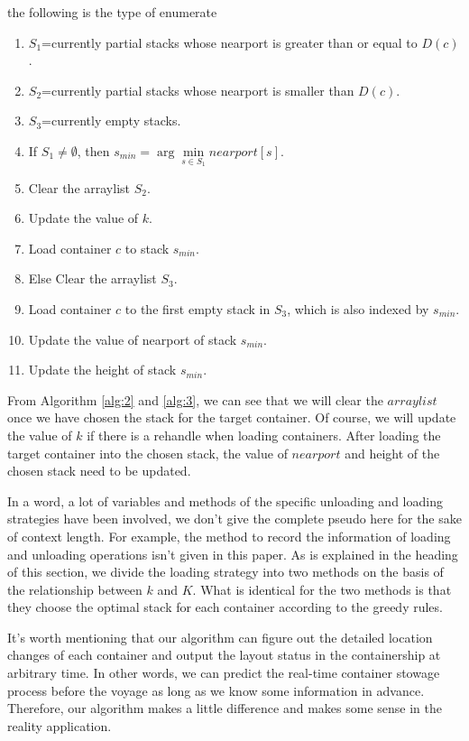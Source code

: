 \documentclass[review,3p,times,authoryear,12pt]{elsarticle}
\begin{document}
the following is the type of enumerate

\begin{enumerate}[step 1]
\item $S_1$=currently partial stacks whose nearport is greater than or equal to $D(c)$.
\item $S_2$=currently partial stacks whose nearport is smaller than $D(c)$.
\item $S_3$=currently empty stacks.
\item If $S_1\neq \emptyset$, then $s_{min}=\arg\min \limits_{s\in S_1} nearport[s]$.
\item Clear the arraylist $S_2$.
\item Update the value of $k$.
\item Load container $c$ to stack $s_{min}$.
\item Else Clear the arraylist $S_3$.
\item Load container $c$ to the first empty stack in $S_3$, which is also indexed by $s_{min}$.
\item Update the value of nearport of stack $s_{min}$.
\item Update the height of stack $s_{min}$.
\end{enumerate}

From Algorithm \ref{alg:2} and \ref{alg:3}, we can see that we will clear the $arraylist$ once we have chosen the stack for the target container.
Of course, we will update the value of $k$ if there is a rehandle when loading containers.
After loading the target container into the chosen stack, the value of $nearport$ and height of the chosen stack need to be updated.

In a word, a lot of variables and methods of the specific unloading and loading strategies have been involved, we don't give the complete pseudo here for the sake of context length.
For example, the method to record the information of loading and unloading operations isn't given in this paper.
As is explained in the heading of this section, we divide the loading strategy into two methods on the basis of the relationship between $k$ and $K$.
What is identical for the two methods is that they choose the optimal stack for each container according to the greedy rules.

It's worth mentioning that our algorithm can figure out the detailed location changes of each container and output the layout status in the containership at arbitrary time.
In other words, we can predict the real-time container stowage process before the voyage as long as we know some information in advance.
Therefore, our algorithm makes a little difference and makes some sense in the reality application.
\end{document}
